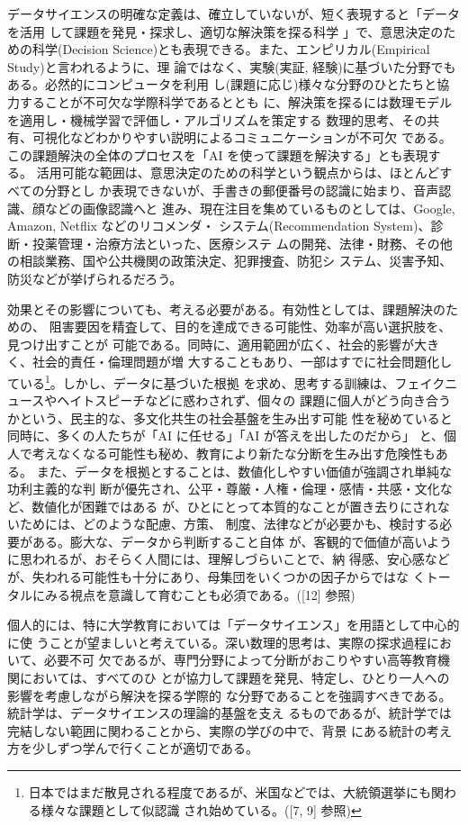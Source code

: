 \documentclass[
]{book}
\theoremstyle{definition}
\theoremstyle{definition}
\theoremstyle{definition}
\theoremstyle{definition}
\theoremstyle{remark}
\begin{document}
データサイエンスの明確な定義は、確立していないが、短く表現すると「データを活用 して課題を発見・探求し、適切な解決策を探る科学 」で、意思決定のための科学(Decision Science)とも表現できる。また、エンピリカル(Empirical Study)と言われるように、理 論ではなく、実験(実証, 経験)に基づいた分野でもある。必然的にコンピュータを利用 し(課題に応じ)様々な分野のひとたちと協力することが不可欠な学際科学であるととも に、解決策を探るには数理モデルを適用し・機械学習で評価し・アルゴリズムを策定する 数理的思考、その共有、可視化などわかりやすい説明によるコミュニケーションが不可欠 である。この課題解決の全体のプロセスを「AI を使って課題を解決する」とも表現する。 活用可能な範囲は、意思決定のための科学という観点からは、ほとんどすべての分野とし か表現できないが、手書きの郵便番号の認識に始まり、音声認識、顔などの画像認識へと 進み、現在注目を集めているものとしては、Google, Amazon, Netflix などのリコメンダ・ システム(Recommendation System)、診断・投薬管理・治療方法といった、医療システ ムの開発、法律・財務、その他の相談業務、国や公共機関の政策決定、犯罪捜査、防犯シ ステム、災害予知、防災などが挙げられるだろう。

効果とその影響についても、考える必要がある。有効性としては、課題解決のための、 阻害要因を精査して、目的を達成できる可能性、効率が高い選択肢を、見つけ出すことが 可能である。同時に、適用範囲が広く、社会的影響が大きく、社会的責任・倫理問題が増 大することもあり、一部はすでに社会問題化している\footnote{日本ではまだ散見される程度であるが、米国などでは、大統領選挙にも関わる様々な課題として似認識 され始めている。({[}7, 9{]} 参照)}。しかし、データに基づいた根拠 を求め、思考する訓練は、フェイクニュースやヘイトスピーチなどに惑わされず、個々の 課題に個人がどう向き合うかという、民主的な、多文化共生の社会基盤を生み出す可能 性を秘めていると同時に、多くの人たちが「AI に任せる」「AI が答えを出したのだから」 と、個人で考えなくなる可能性も秘め、教育により新たな分断を生み出す危険性もある。 また、データを根拠とすることは、数値化しやすい価値が強調され単純な功利主義的な判 断が優先され、公平・尊厳・人権・倫理・感情・共感・文化など、数値化が困難ではある が、ひとにとって本質的なことが置き去りにされないためには、どのような配慮、方策、 制度、法律などが必要かも、検討する必要がある。膨大な、データから判断すること自体 が、客観的で価値が高いように思われるが、おそらく人間には、理解しづらいことで、納 得感、安心感などが、失われる可能性も十分にあり、母集団をいくつかの因子からではな くトータルにみる視点を意識して育むことも必須である。({[}12{]} 参照)

個人的には、特に大学教育においては「データサイエンス」を用語として中心的に使 うことが望ましいと考えている。深い数理的思考は、実際の探求過程において、必要不可 欠であるが、専門分野によって分断がおこりやすい高等教育機関においては、すべてのひ とが協力して課題を発見、特定し、ひとり一人への影響を考慮しながら解決を探る学際的 な分野であることを強調すべきである。統計学は、データサイエンスの理論的基盤を支え るものであるが、統計学では完結しない範囲に関わることから、実際の学びの中で、背景 にある統計の考え方を少しずつ学んで行くことが適切である。
\end{document}
